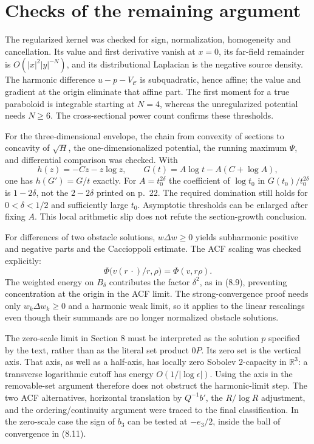 \documentclass[10pt]{article}
\begin{document}
\section*{Checks of the remaining argument}
The regularized kernel was checked for sign, normalization, homogeneity and cancellation. Its value and first derivative vanish at \(x=0\), its far-field remainder is \(O(|x|^2|y|^{-N})\), and its distributional Laplacian is the negative source density. The harmonic difference \(u-p-V_{\mathcal C}\) is subquadratic, hence affine; the value and gradient at the origin eliminate that affine part. The first moment for a true paraboloid is integrable starting at \(N=4\), whereas the unregularized potential needs \(N\geq6\). The cross-sectional power count confirms these thresholds.\par
For the three-dimensional envelope, the chain from convexity of sections to concavity of \(\sqrt{H}\), the one-dimensionalized potential, the running maximum \(\Psi\), and differential comparison was checked. With \[h(z)=-Cz-z\log z,\qquad
G(t)=A\log t-A(C+\log A),\] one has \(h(G')=G/t\) exactly. For \(A=t_0^{2\delta}\) the coefficient of \(\log t_0\) in \(G(t_0)/t_0^{2\delta}\) is \(1-2\delta\), not the \(2-2\delta\) printed on p. 22. The required domination still holds for \(0<\delta<1/2\) and sufficiently large \(t_0\). Asymptotic thresholds can be enlarged after fixing \(A\). This local arithmetic slip does not refute the section-growth conclusion.\par
For differences of two obstacle solutions, \(w\Delta w\geq0\) yields subharmonic positive and negative parts and the Caccioppoli estimate. The ACF scaling was checked explicitly: \[\Phi\bigl(v(r\,\cdot)/r,\rho\bigr)=\Phi(v,r\rho).\] The weighted energy on \(B_\delta\) contributes the factor \(\delta^2\), as in (8.9), preventing concentration at the origin in the ACF limit. The strong-convergence proof needs only \(w_k\Delta w_k\geq0\) and a harmonic weak limit, so it applies to the linear rescalings even though their summands are no longer normalized obstacle solutions.\par
The zero-scale limit in Section 8 must be interpreted as the solution \(p\) specified by the text, rather than as the literal set product \(0P\). Its zero set is the vertical axis. That axis, as well as a half-axis, has locally zero Sobolev \(2\)-capacity in \(\mathbb R^3\): a transverse logarithmic cutoff has energy \(O(1/|\log\epsilon|)\). Using the axis in the removable-set argument therefore does not obstruct the harmonic-limit step. The two ACF alternatives, horizontal translation by \(Q^{-1}b'\), the \(R/\log R\) adjustment, and the ordering/continuity argument were traced to the final classification. In the zero-scale case the sign of \(b_3\) can be tested at \(-e_3/2\), inside the ball of convergence in (8.11).\par
\end{document}
